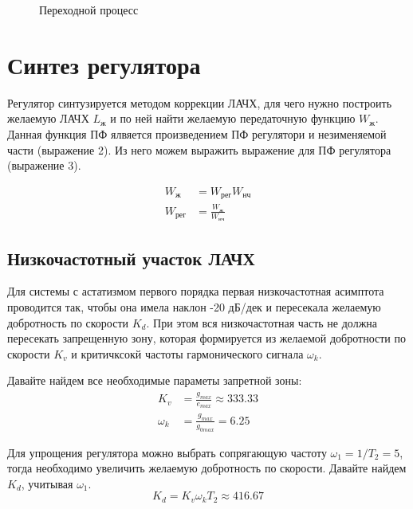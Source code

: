 \documentclass[a4paper, 12pt]{article}
\begin{document}
\begin{figure}[h!]
    \centering
    \caption{Переходной процесс}
\end{figure}

\newpage
\section{Синтез регулятора}
Регулятор синтузируется методом коррекции ЛАЧХ, для чего нужно построить желаемую ЛАЧХ $L_\text{ж}$ и по ней найти желаемую передаточную функцию $W_\text{ж}$. Данная функция ПФ ялвяется произведением ПФ регулятори и незименяемой части (выражение 2). Из него можем выражить выражение для ПФ регулятора (выражение 3).\par
\begin{align}
    W_\text{ж} & = W_\text{рег}W_\text{нч} \\
    W_\text{рег} & = \frac{W_\text{ж}}{W_\text{нч}}
\end{align} \par
\subsection{Низкочастотный участок ЛАЧХ}
Для системы с астатизмом первого порядка первая низкочастотная асимптота проводится так, чтобы она имела наклон -20 дБ/дек и пересекала желаемую добротность по скорости $K_d$. При этом вся низкочастотная часть не должна пересекать запрещенную зону, которая формируется из желаемой добротности по скорости $K_v$ и критичксокй частоты гармонического сигнала $\omega_k$.\par
Давайте найдем все необходимые параметы запретной зоны:  
\begin{align} 
    K_v &= \frac{g_{max}}{e_{max}} \approx 333.33 \\
    \omega_k & = \frac{g_{max}}{g_{0max}} = 6.25
\end{align} \par

Для упрощения регулятора можно выбрать сопрягающую частоту $\omega_1 = 1/T_2 = 5$, тогда необходимо увеличить желаемую добротность по скорости. Давайте найдем $K_d$, учитывая $\omega_1$.
\begin{equation}
    K_d = K_v\omega_kT_2 \approx 416.67
\end{equation}
\end{document}

